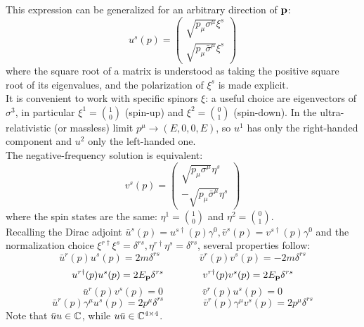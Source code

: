 This expression can be generalized for an arbitrary direction of $ \mathbf{p} $:
\begin{equation}
  u^s(p) =
  \begin{pmatrix}
    \sqrt{p_\mu \sigma^\mu} \xi^s \\
    \sqrt{p_\mu \bar{\sigma}^\mu} \xi^s
  \end{pmatrix}
  \label{eq:u-spinor-def}
\end{equation}
where the square root of a matrix is understood as taking the positive square root of its eigenvalues, and the polarization of $ \xi^s $ is made explicit.\\
It is convenient to work with specific spinors $ \xi $: a useful choice are eigenvectors of $ \sigma^3 $, in particular $ \xi^1 = \binom{1}{0} $ (spin-up) and $ \xi^2 = \binom{0}{1} $ (spin-down). In the ultra-relativistic (or massless) limit $ p^\mu \rightarrow (E, 0, 0, E) $, so $ u^1 $ has only the right-handed component and $ u^2 $ only the left-handed one.\\
The negative-frequency solution is equivalent:
\begin{equation}
  v^s(p) =
    \begin{pmatrix}
      \sqrt{p_\mu \sigma^\mu} \eta^s \\
      -\sqrt{p_\mu \bar{\sigma}^\mu} \eta^s
    \end{pmatrix}
  \label{eq:v-spinor-def}
\end{equation}
where the spin states are the same: $ \eta^1 = \binom{1}{0} $ and $ \eta^2 = \binom{0}{1} $.\\
Recalling the Dirac adjoint $ \bar{u}^s(p) = u^{s \dagger}(p) \gamma^0 , \bar{v}^s(p) = v^{s \dagger}(p) \gamma^0 $ and the normalization choice $ \xi^{r \dagger} \xi^s = \delta^{rs} , \eta^{r \dagger} \eta^s = \delta^{rs} $, several properties follow:
\begin{equation}
  \bar{u}^r(p) u^s(p) = 2m \delta^{rs}
  \qquad \qquad
  \bar{v}^r(p) v^s(p) = -2m \delta^{rs}
\end{equation}
\begin{equation}
  u^{r \dagger}(p) u^s(p) = 2E_{\mathbf{p}} \delta^{rs}
  \qquad \qquad
  v^{r \dagger}(p) v^s(p) = 2E_{\mathbf{p}} \delta^{rs}
  \label{eq:uv-spin-id}
\end{equation}
\begin{equation}
  \bar{u}^r(p) v^s(p) = 0
  \qquad \qquad
  \bar{v}^r(p) u^s(p) = 0
\end{equation}
\begin{equation}
  \bar{u}^r(p) \gamma^\mu u^s(p) = 2 p^\mu \delta^{rs}
  \qquad \qquad
  \bar{v}^r(p) \gamma^\mu v^s(p) = 2 p^\mu \delta^{rs}
  \label{eq:spinor-gamma-mu}
\end{equation}
Note that $ \bar{u}u \in \mathbb{C} $, while $ u\bar{u} \in \mathbb{C}^{4 \times 4} $.

